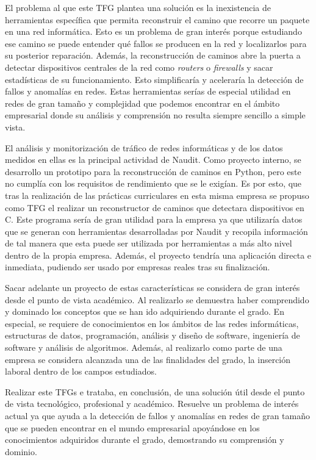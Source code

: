 \documentclass[twoside, 12pt]{epstfg}
\begin{document}
El problema al que este TFG plantea una solución es la inexistencia de herramientas específica que permita reconstruir el camino que recorre un paquete en una red informática. Esto es un problema de gran interés porque estudiando ese camino se puede entender qué fallos se producen en la red y localizarlos para su posterior reparación. Además, la reconstrucción de caminos abre la puerta a detectar dispositivos centrales de la red como \textit{routers} o \textit{firewalls} y sacar estadísticas de su funcionamiento. Esto simplificaría y aceleraría la detección de fallos y anomalías en redes. Estas herramientas serías de especial utilidad en redes de gran tamaño y complejidad que podemos encontrar en el ámbito empresarial donde su análisis y comprensión no resulta siempre sencillo a simple vista.

El análisis y monitorización de tráfico de redes informáticas y de los datos medidos en ellas es la principal actividad de Naudit. Como proyecto interno, se desarrollo un prototipo para la reconstrucción de caminos en Python, pero este no cumplía con los requisitos de rendimiento que se le exigían. Es por esto, que tras la realización de las prácticas curriculares en esta misma empresa se propuso como TFG el realizar un reconstructor de caminos que detectara dispositivos en C. Este programa sería de gran utilidad para la empresa ya que utilizaría datos que se generan con herramientas desarrolladas por Naudit y recopila información de tal manera que esta puede ser utilizada por herramientas a más alto nivel dentro de la propia empresa. Además, el proyecto tendría una aplicación directa e inmediata, pudiendo ser usado por empresas reales tras su finalización.

Sacar adelante un proyecto de estas características se considera de gran interés desde el punto de vista académico. Al realizarlo se demuestra haber comprendido y dominado los conceptos que se han ido adquiriendo durante el grado. En especial, se requiere de conocimientos en los ámbitos de las redes informáticas, estructuras de datos, programación, análisis y diseño de software, ingeniería de software y análisis de algoritmos. Además, al realizarlo como parte de una empresa se considera alcanzada una de las finalidades del grado, la inserción laboral dentro de los campos estudiados. 

Realizar este TFGs e trataba, en conclusión, de una solución útil desde el punto de vista tecnológico, profesional y académico. Resuelve un problema de interés actual ya que ayuda a la detección de fallos y anomalías en redes de gran tamaño que se pueden encontrar en el mundo empresarial apoyándose en los conocimientos adquiridos durante el grado, demostrando su comprensión y dominio. 
\end{document}
